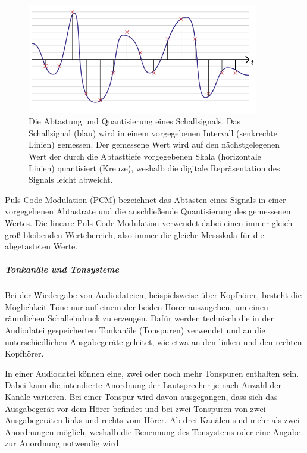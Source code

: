 \begin{figure}[!htp]
  \begin{center}
    \includegraphics[width=0.9\textwidth]{bilder/audio_abtastrateAbtasttiefe}
  \end{center}
	\caption{Die Abtastung und Quantisierung eines Schallsignals. Das Schallsignal (blau) wird in einem vorgegebenen Intervall (senkrechte Linien) gemessen. Der gemessene Wert wird auf den nächstgelegenen Wert der durch die Abtasttiefe vorgegebenen Skala (horizontale Linien) quantisiert (Kreuze), weshalb die digitale Repräsentation des Signals leicht abweicht.}
\end{figure}

Puls-Code-Modulation (PCM) bezeichnet das Abtasten eines Signals in einer vorgegebenen Abtastrate und die anschließende Quantisierung des gemessenen Wertes. Die lineare Puls-Code-Modulation verwendet dabei einen immer gleich groß bleibenden Wertebereich, also immer die gleiche Messskala für die abgetasteten Werte.


\subparagraph{Tonkanäle und Tonsysteme}
Bei der Wiedergabe von Audiodateien, beispielsweise über Kopfhörer, besteht die Möglichkeit Töne nur auf einem der beiden Hörer auszugeben, um einen räumlichen Schalleindruck zu erzeugen. Dafür werden technisch die in der Audiodatei gespeicherten Tonkanäle (Tonspuren) verwendet und an die unterschiedlichen Ausgabegeräte geleitet, wie etwa an den linken und den rechten Kopfhörer.

In einer Audiodatei können eine, zwei oder noch mehr Tonspuren enthalten sein. Dabei kann die intendierte Anordnung der Lautsprecher je nach Anzahl der Kanäle variieren. Bei einer Tonspur wird davon ausgegangen, dass sich das Ausgabegerät vor dem Hörer befindet und bei zwei Tonspuren von zwei Ausgabegeräten links und rechts vom Hörer. Ab drei Kanälen sind mehr als zwei Anordnungen möglich, weshalb die Benennung des Tonsystems oder eine Angabe zur Anordnung notwendig wird. 

